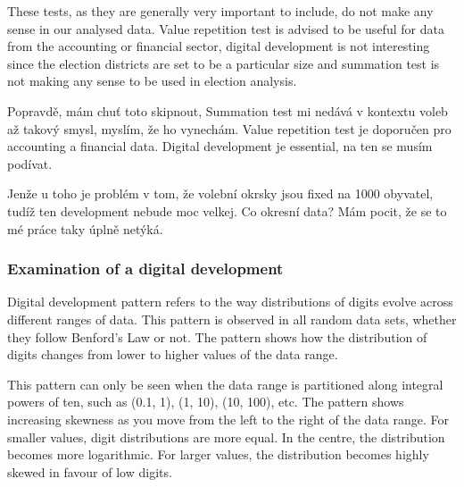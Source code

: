 These tests, as they are generally very important to include, do not make any sense in our analysed data. Value repetition test is advised to be useful for data from the accounting or financial sector, digital development is not interesting since the election districts are set to be a particular size and summation test is not making any sense to be used in election analysis. 


\begin{koment}
    Popravdě, mám chuť toto skipnout, Summation test mi nedává v kontextu voleb až takový smysl, myslím, že ho vynechám. Value repetition test je doporučen pro accounting a financial data. Digital development je essential, na ten se musím podívat.  

    Jenže u toho je problém v tom, že volební okrsky jsou fixed na 1000 obyvatel, tudíž ten development nebude moc velkej. Co okresní data? Mám pocit, že se to mé práce taky úplně netýká. 
\end{koment}


\subsubsection*{Examination of a digital development}

Digital development pattern refers to the way distributions of digits evolve across different ranges of data. This pattern is observed in all random data sets, whether they follow Benford's Law or not. The pattern shows how the distribution of digits changes from lower to higher values of the data range. 

This pattern can only be seen when the data range is partitioned along integral powers of ten, such as (0.1, 1), (1, 10), (10, 100), etc. The pattern shows increasing skewness as you move from the left to the right of the data range. For smaller values, digit distributions are more equal. In the centre, the distribution becomes more logarithmic. For larger values, the distribution becomes highly skewed in favour of low digits. \cite{kossovsky2014benford}



